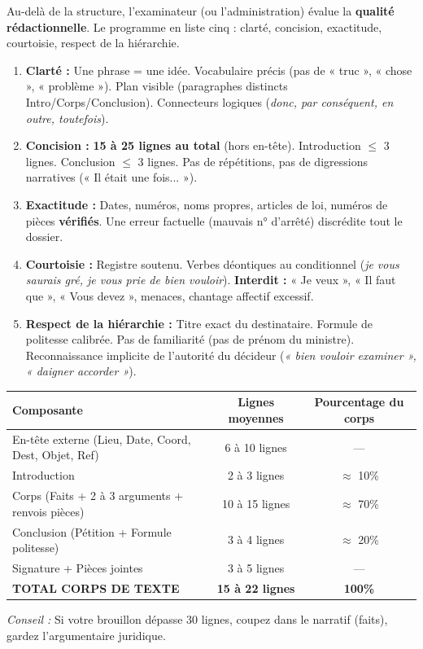 \documentclass[11pt]{article}
\begin{document}
Au-delà de la structure, l'examinateur (ou l'administration) évalue la \textbf{qualité rédactionnelle}. Le programme en liste cinq : clarté, concision, exactitude, courtoisie, respect de la hiérarchie.

\begin{propriete}
\begin{enumerate}
    \item \textbf{Clarté :} Une phrase = une idée. Vocabulaire précis (pas de « truc », « chose », « problème »). Plan visible (paragraphes distincts Intro/Corps/Conclusion). Connecteurs logiques (\emph{donc, par conséquent, en outre, toutefois}).
    \item \textbf{Concision :} \textbf{15 à 25 lignes au total} (hors en-tête). Introduction $\le$ 3 lignes. Conclusion $\le$ 3 lignes. Pas de répétitions, pas de digressions narratives (« Il était une fois... »).
    \item \textbf{Exactitude :} Dates, numéros, noms propres, articles de loi, numéros de pièces \textbf{vérifiés}. Une erreur factuelle (mauvais n° d'arrêté) discrédite tout le dossier.
    \item \textbf{Courtoisie :} Registre soutenu. Verbes déontiques au conditionnel (\emph{je vous saurais gré, je vous prie de bien vouloir}). \textbf{Interdit :} « Je veux », « Il faut que », « Vous devez », menaces, chantage affectif excessif.
    \item \textbf{Respect de la hiérarchie :} Titre exact du destinataire. Formule de politesse calibrée. Pas de familiarité (pas de prénom du ministre). Reconnaissance implicite de l'autorité du décideur (\emph{« bien vouloir examiner », « daigner accorder »}).
\end{enumerate}
\end{propriete}

\begin{exemplebox}
\begin{center}
\begin{tabular}{|l|c|c|}\hline
\textbf{Composante} & \textbf{Lignes moyennes} & \textbf{Pourcentage du corps} \\ \hline
En-tête externe (Lieu, Date, Coord, Dest, Objet, Ref) & 6 à 10 lignes & — \\ \hline
Introduction & 2 à 3 lignes & $\approx$ 10\% \\ \hline
Corps (Faits + 2 à 3 arguments + renvois pièces) & 10 à 15 lignes & $\approx$ 70\% \\ \hline
Conclusion (Pétition + Formule politesse) & 3 à 4 lignes & $\approx$ 20\% \\ \hline
Signature + Pièces jointes & 3 à 5 lignes & — \\ \hline
\textbf{TOTAL CORPS DE TEXTE} & \textbf{15 à 22 lignes} & \textbf{100\%} \\ \hline
\end{tabular}
\end{center}
\textit{Conseil :} Si votre brouillon dépasse 30 lignes, coupez dans le narratif (faits), gardez l'argumentaire juridique.
\end{exemplebox}
\end{document}
